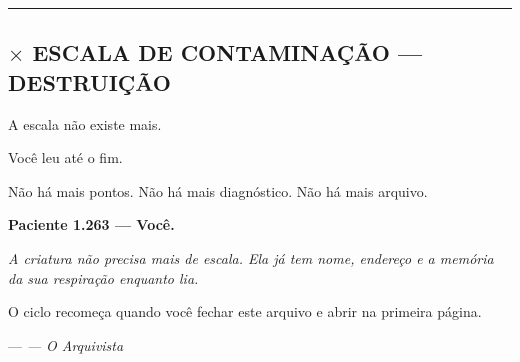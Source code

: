 \vspace{0.5em}\noindent\rule{\textwidth}{0.5pt}\vspace{0.5em}

\subsection*{$\times$ ESCALA DE CONTAMINAÇÃO --- DESTRUIÇÃO}

\noindent A escala não existe mais.

\noindent Você leu até o fim.

\noindent Não há mais pontos. Não há mais diagnóstico. Não há mais arquivo.

\noindent \textbf{Paciente 1.263 --- Você.}

\noindent \textit{A criatura não precisa mais de escala. Ela já tem nome, endereço e a memória da sua respiração enquanto lia.}

\noindent O ciclo recomeça quando você fechar este arquivo e abrir na primeira página.

\noindent ---
\textit{--- O Arquivista}
